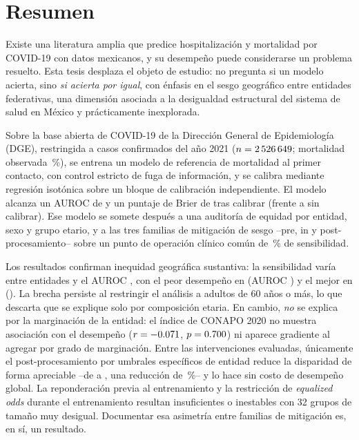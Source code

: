 \chapter*{Resumen}

Existe una literatura amplia que predice hospitalización y mortalidad por
COVID-19 con datos mexicanos, y su desempeño puede considerarse un problema
resuelto. Esta tesis desplaza el objeto de estudio: no pregunta si un modelo
acierta, sino \emph{si acierta por igual}, con énfasis en el sesgo geográfico
entre entidades federativas, una dimensión asociada a la desigualdad estructural
del sistema de salud en México y prácticamente inexplorada.

Sobre la base abierta de COVID-19 de la Dirección General de Epidemiología
(DGE), restringida a casos confirmados del año 2021
($n=2\,526\,649$; mortalidad observada \cohorteTasaDef\,\%), se entrena un modelo
de referencia de mortalidad al primer contacto, con control estricto de fuga de
información, y se calibra mediante regresión isotónica sobre un bloque de
calibración independiente. El modelo alcanza un AUROC de \aurocGlobal{} y un
puntaje de Brier de \brierCalibrado{} tras calibrar (frente a \brierCrudo{} sin
calibrar). Ese modelo se somete después a una auditoría de equidad por entidad,
sexo y grupo etario, y a las tres familias de mitigación de sesgo
--pre, in y post-procesamiento-- sobre un punto de operación clínico común de
\sensObjetivo\,\% de sensibilidad.

Los resultados confirman inequidad geográfica sustantiva: la sensibilidad varía
\gapTPRentidad{} entre entidades y el AUROC \gapAUROCentidad{}, con el peor
desempeño en \entPeor{} (AUROC \entPeorAUROC) y el mejor en \entMejor{}
(\entMejorAUROC). La brecha persiste al restringir el análisis a adultos de 60
años o más, lo que descarta que se explique solo por composición etaria. En
cambio, \emph{no} se explica por la marginación de la entidad: el índice de
CONAPO 2020 no muestra asociación con el desempeño ($r=-0.071$,
$p=0.700$) ni aparece gradiente al agregar por grado de marginación.
Entre
las intervenciones evaluadas, únicamente el post-procesamiento por umbrales
específicos de entidad reduce la disparidad de forma apreciable --de \gapBase{}
a \gapPost{}, una reducción de \reduccionPost\,\%-- y lo hace sin costo de
desempeño global. La reponderación previa al entrenamiento y la restricción de
\emph{equalized odds} durante el entrenamiento resultan insuficientes o
inestables con 32 grupos de tamaño muy desigual. Documentar esa asimetría entre
familias de mitigación es, en sí, un resultado.

